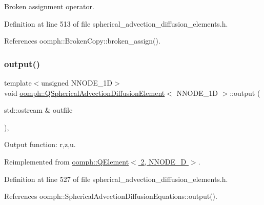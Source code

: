 Broken assignment operator. 



Definition at line 513 of file spherical\+\_\+advection\+\_\+diffusion\+\_\+elements.\+h.



References oomph\+::\+Broken\+Copy\+::broken\+\_\+assign().

\mbox{\label{classoomph_1_1QSphericalAdvectionDiffusionElement_addf1f59cc684120c3063774ce75a72a4}} 
\subsubsection{\texorpdfstring{output()}{output()}\hspace{0.1cm}{\footnotesize\ttfamily [1/4]}}
{\footnotesize\ttfamily template$<$unsigned N\+N\+O\+D\+E\+\_\+1D$>$ \\
void \hyperlink{classoomph_1_1QSphericalAdvectionDiffusionElement}{oomph\+::\+Q\+Spherical\+Advection\+Diffusion\+Element}$<$ N\+N\+O\+D\+E\+\_\+1D $>$\+::output (\begin{DoxyParamCaption}\item[{std\+::ostream \&}]{outfile }\end{DoxyParamCaption})\hspace{0.3cm}{\ttfamily [inline]}, {\ttfamily [virtual]}}



Output function\+: r,z,u. 



Reimplemented from \hyperlink{classoomph_1_1QElement_3_012_00_01NNODE__1D_01_4_ab7bb815a43598e7ce0c4d10c511504fc}{oomph\+::\+Q\+Element$<$ 2, N\+N\+O\+D\+E\+\_\+D $>$}.



Definition at line 527 of file spherical\+\_\+advection\+\_\+diffusion\+\_\+elements.\+h.



References oomph\+::\+Spherical\+Advection\+Diffusion\+Equations\+::output().

\mbox{\label{classoomph_1_1QSphericalAdvectionDiffusionElement_abc3c98e85e168e66999ccae5a35e0987}} 
